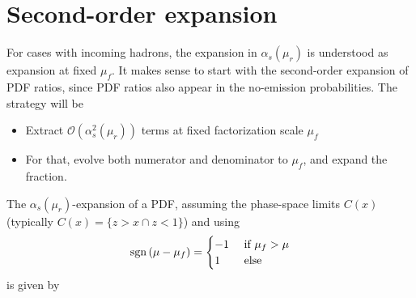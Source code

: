 \documentclass[a4paper,11pt]{article}
\newcommand{\sgn}[2]{\mathrm{sgn}\left(#1-#2\right)}
\begin{document}
\section{Second-order expansion}
\label{sec:expansion}

For cases with incoming hadrons, the expansion in $\alpha_s(\mu_r)$ is understood as expansion at fixed $\mu_f$.
It makes sense to start with the second-order expansion of PDF ratios, since PDF ratios also appear in the no-emission probabilities. The strategy will be
\begin{itemize}
\item Extract $\mathcal{O}(\alpha_s^2(\mu_r))$ terms at fixed factorization scale $\mu_f$
\item For that, evolve both numerator and denominator to $\mu_f$, and expand the fraction.
\end{itemize}
The $\alpha_s(\mu_r)$-expansion of a PDF, assuming the phase-space limits $C(x)$ (typically $C(x)=\{z>x \cap z<1\}$) and using
\begin{eqnarray*}
\sgn{\mu}{\mu_f} =
\begin{cases}
-1 & \textnormal{~if~} \mu_f>\mu\\
1 & \textnormal{~else} 
\end{cases}
\end{eqnarray*}
is given by
\end{document}
